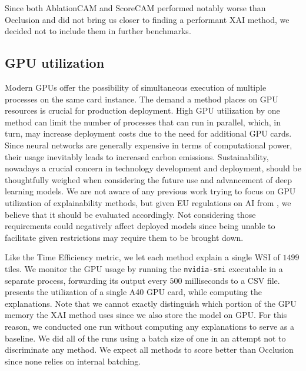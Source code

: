 Since both AblationCAM and ScoreCAM performed notably worse than Occlusion and did not bring us closer to finding a performant XAI method, we decided not to include them in further benchmarks.

\subsection*{GPU utilization}

Modern GPUs offer the possibility of simultaneous execution of multiple processes on the same card instance.
The demand a method places on GPU resources is crucial for production deployment.
High GPU utilization by one method can limit the number of processes that can run in parallel, which, in turn, may increase deployment costs due to the need for additional GPU cards.
Since neural networks are generally expensive in terms of computational power, their usage inevitably leads to increased carbon emissions.
Sustainability, nowadays a crucial concern in technology development and deployment, should be thoughtfully weighed when considering the future use and advancement of deep learning models.
We are not aware of any previous work trying to focus on GPU utilization of explainability methods, but given EU regulations on AI from , we believe that it should be evaluated accordingly.
Not considering those requirements could negatively affect deployed models since being unable to facilitate given restrictions may require them to be brought down.

Like the Time Efficiency metric, we let each method explain a single WSI of $1499$ tiles.
We monitor the GPU usage by running the \texttt{nvidia-smi} executable in a separate process, forwarding its output every $500$ milliseconds to a CSV file.
 presents the utilization of a single A40 GPU card, while computing the explanations.
Note that we cannot exactly distinguish which portion of the GPU memory the XAI method uses since we also store the model on GPU.
For this reason, we conducted one run without computing any explanations to serve as a baseline.
We did all of the runs using a batch size of one in an attempt not to discriminate any method.
We expect all methods to score better than Occlusion since none relies on internal batching.

